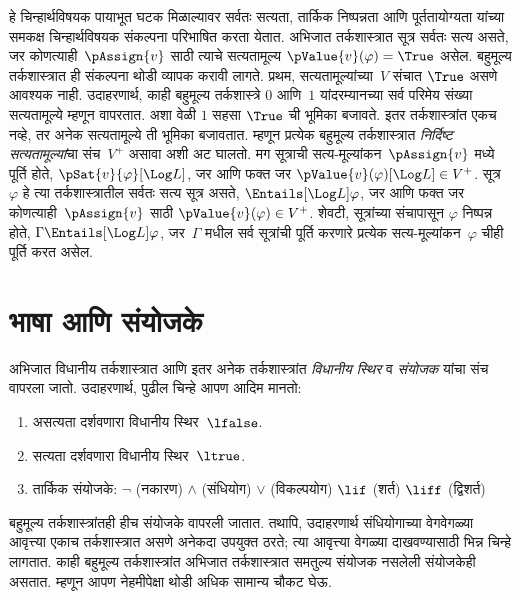 हे चिन्हार्थविषयक पायाभूत घटक मिळाल्यावर सर्वतः सत्यता,
तार्किक निष्पन्नता आणि पूर्ततायोग्यता यांच्या समकक्ष
चिन्हार्थविषयक संकल्पना परिभाषित करता येतात. अभिजात
तर्कशास्त्रात सूत्र सर्वतः सत्य असते, जर
कोणत्याही~$\pAssign{v}$ साठी त्याचे सत्यतामूल्य
$\pValue{v}(\varphi) = \True$ असेल. बहुमूल्य तर्कशास्त्रात ही
संकल्पना थोडी व्यापक करावी लागते. प्रथम, सत्यतामूल्यांच्या~$V$
संचात $\True$ असणे आवश्यक नाही. उदाहरणार्थ,
काही बहुमूल्य तर्कशास्त्रे $0$ आणि~$1$ यांदरम्यानच्या सर्व
परिमेय संख्या सत्यतामूल्ये म्हणून वापरतात. अशा वेळी $1$
सहसा $\True$ ची भूमिका बजावते. इतर तर्कशास्त्रांत
एकच नव्हे, तर अनेक सत्यतामूल्ये ती भूमिका बजावतात.
म्हणून प्रत्येक बहुमूल्य तर्कशास्त्रात \emph{निर्दिष्ट
सत्यतामूल्यां}चा संच~$V^+$ असावा अशी अट घालतो.
मग सूत्राची सत्य-मूल्यांकन~$\pAssign{v}$ मध्ये
पूर्ति होते, $\pSat{v}{\varphi}[\Log L]$, जर आणि फक्त जर
$\pValue{v}(\varphi)[\Log L] \in V^+$. सूत्र~$\varphi$
हे त्या तर्कशास्त्रातील सर्वतः सत्य सूत्र असते,
$\Entails[\Log L] \varphi$, जर आणि फक्त जर
कोणत्याही~$\pAssign{v}$ साठी $\pValue{v}(\varphi) \in V^+$.
शेवटी, सूत्रांच्या संचापासून $\varphi$ निष्पन्न होते,
$\Gamma \Entails[\Log L] \varphi$, जर~$\Gamma$ मधील सर्व
सूत्रांची पूर्ति करणारे प्रत्येक सत्य-मूल्यांकन~$\varphi$
चीही पूर्ति करत असेल.












\section{भाषा आणि संयोजके}\label{mvl:syn:con:sec}

अभिजात विधानीय तर्कशास्त्रात आणि इतर अनेक तर्कशास्त्रांत
\emph{विधानीय स्थिर} व \emph{संयोजक} यांचा संच वापरला जातो.
उदाहरणार्थ, पुढील चिन्हे आपण आदिम मानतो:
\begin{enumerate}
\item असत्यता दर्शवणारा विधानीय स्थिर~$\lfalse$.
\item सत्यता दर्शवणारा विधानीय स्थिर~$\ltrue$.
\item तार्किक संयोजके:
  \startycommalist
  \ycomma $\lnot$ (नकारण)
  \ycomma $\land$ (संधियोग)
  \ycomma $\lor$ (विकल्पयोग)
  \ycomma $\lif$ (शर्त)
  \ycomma $\liff$ (द्विशर्त)
\end{enumerate}


बहुमूल्य तर्कशास्त्रांतही हीच संयोजके वापरली जातात. तथापि,
उदाहरणार्थ संधियोगाच्या वेगवेगळ्या आवृत्त्या एकाच तर्कशास्त्रात
असणे अनेकदा उपयुक्त ठरते; त्या आवृत्त्या वेगळ्या दाखवण्यासाठी
भिन्न चिन्हे लागतात. काही बहुमूल्य तर्कशास्त्रांत अभिजात
तर्कशास्त्रात समतुल्य संयोजक नसलेली संयोजकेही असतात.
म्हणून आपण नेहमीपेक्षा थोडी अधिक सामान्य चौकट घेऊ.

